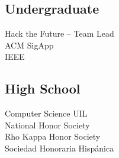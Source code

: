 \documentclass[letterpaper]{deedy-resume} %
\begin{document}
\begin{minipage}[t]{0.33\textwidth}
\subsection{Undergraduate}

Hack the Future -- Team Lead \\
ACM SigApp \\
IEEE \\

\sectionspace %


\subsection{High School}

Computer Science UIL  \\
National Honor Society \\
Rho Kappa Honor Society \\
Sociedad Honoraria Hispánica \\

\sectionspace %


\end{minipage} %
\hfill
%
%
\end{document}
